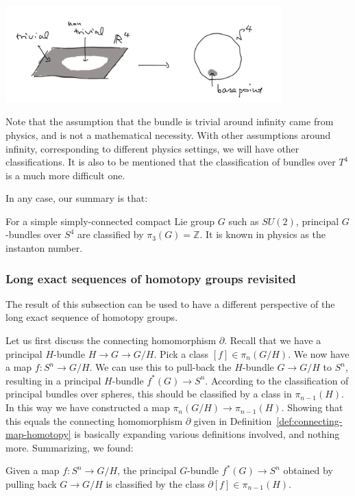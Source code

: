 \documentclass[12pt]{article}
\numberwithin{equation}{section}
\theoremstyle{remark}
\renewenvironment{figure}[1][]{
  \begin{originalfigure}[#1]
    \begin{mdframed}[linecolor=black!0,backgroundcolor=black!1]
}{
    \end{mdframed}
  \end{originalfigure}
}
\def\bR{\mathbb{R}}
\def\bZ{\mathbb{Z}}
\begin{document}
\begin{figure}[h]
  \centering
  \includegraphics[width=0.8\textwidth]{bundle-R4.png}
  \caption{Principal bundle over $\bR^4$ with a trivialization around infinity
  is given by a pull-back from $S^4$}
  \label{fig:bundle-R4}
\end{figure}

Note that the assumption that the bundle is trivial around infinity 
came from physics, and is not a mathematical necessity.
With other assumptions around infinity,
corresponding to different physics settings,
we will have other classifications.
It is also to be mentioned that the classification of bundles over $T^4$ 
is a much more difficult one.

In any case, our summary is that:
\begin{example}
For a simple simply-connected compact Lie group $G$ such as $SU(2)$,
principal $G$-bundles over $S^4$ are classified by 
$\pi_3(G)=\bZ$.
It is known in physics as the instanton number.
\end{example}

\subsubsection{Long exact sequences of homotopy groups revisited}
\label{sec:long-exact-and-bundles}
The result of this subsection can be used to have 
a different perspective 
of the long exact sequence of homotopy groups.

Let us first discuss the connecting homomorphism $\partial$.
Recall that we have a principal $H$-bundle $H\to G\to G/H$.
Pick a class $[f]\in \pi_{n}(G/H)$.
We now have a map $f:S^{n}\to G/H$.
We can use this to pull-back the $H$-bundle $G\to G/H$ to $S^n$,
resulting in a principal $H$-bundle $f^*(G)\to S^n$.
According to the classification of principal bundles over spheres,
this should be classified by a class in $ \pi_{n-1}(H)$.
In this way we have constructed a map 
$\pi_{n}(G/H)\to \pi_{n-1}(H)$.
Showing that this equals the connecting homomorphism $\partial$
given in Definition~\ref{def:connecting-map-homotopy} 
is basically expanding various definitions involved, and
nothing more.
Summarizing, we found:
\begin{proposition}
\label{prop:connecting-and-bundle}
  Given a map $f:S^{n}\to G/H$,
  the principal $G$-bundle $f^*(G)\to S^n$ 
  obtained by pulling back $G\to G/H$
  is classified by 
  the class $\partial[f]\in \pi_{n-1}(H)$.
\end{proposition}
\end{document}
